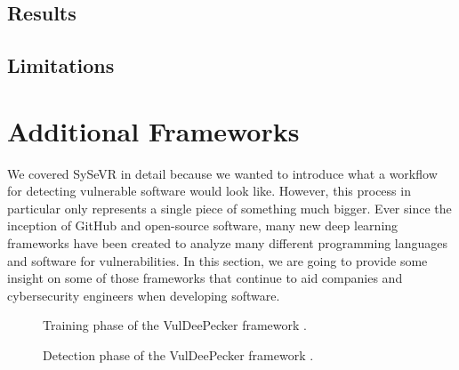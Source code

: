 \documentclass[12pt,twocolumn,letterpaper]{article}
\begin{document}
\subsection{Results}
\label{sub:results}

\subsection{Limitations}
\label{sub:limitations}

\section{Additional Frameworks}
\label{sec:additional-frameworks}

We covered SySeVR in detail because we wanted to introduce what a workflow for detecting vulnerable 
software would look like. However, this process in particular only represents a single piece of something 
much bigger. Ever since the inception of GitHub and open-source software, many new deep learning frameworks have been 
created to analyze many different programming languages and software for vulnerabilities. In this section, 
we are going to provide some insight on some of those frameworks that continue to aid companies and cybersecurity engineers 
when developing software.


\begin{figure}[h!]
    \centering

    \caption{Training phase of the VulDeePecker framework \cite{Zou21}.}
    \label{fig:af-0}
\end{figure}

\begin{figure}[h!]
    \centering

    \caption{Detection phase of the VulDeePecker framework \cite{Zou21}.}
    \label{fig:af-1}
\end{figure}
\end{document}
